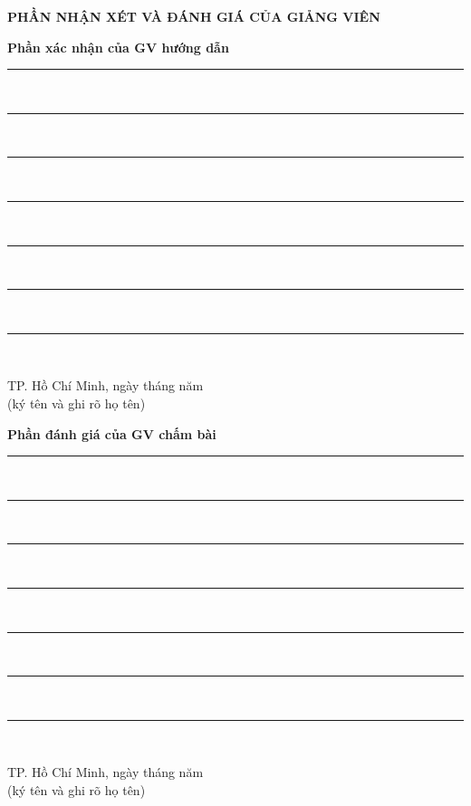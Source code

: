 \documentclass{report}
\newcommand\tab[1][1.25cm]{\hspace*{#1}}
\begin{document}
\begin{center}
	\fontsize{16}{20}\selectfont
	\textbf{PHẦN NHẬN XÉT VÀ ĐÁNH GIÁ CỦA GIẢNG VIÊN}\\
\end{center}
\fontsize{13}{14}\selectfont
\textbf{Phần xác nhận của GV hướng dẫn}\\
\rule{17cm}{1pt}\\
\rule{17cm}{1pt}\\
\rule{17cm}{1pt}\\
\rule{17cm}{1pt}\\
\rule{17cm}{1pt}\\
\rule{17cm}{1pt}\\
\rule{17cm}{1pt}\\
\begin{flushright}
	TP. Hồ Chí Minh, ngày \tab[1cm] tháng \tab[1cm] năm \tab[1cm]\tab \\
	(ký tên và ghi rõ họ tên)\tab[2cm] \\
	\vspace{2cm}
\end{flushright}
\fontsize{13}{14}\selectfont
\textbf{Phần đánh giá của GV chấm bài}\\
\rule{17cm}{1pt}\\
\rule{17cm}{1pt}\\
\rule{17cm}{1pt}\\
\rule{17cm}{1pt}\\
\rule{17cm}{1pt}\\
\rule{17cm}{1pt}\\
\rule{17cm}{1pt}\\
\begin{flushright}
	TP. Hồ Chí Minh, ngày \tab[1cm] tháng \tab[1cm] năm \tab[1cm]\tab \\
	(ký tên và ghi rõ họ tên)\tab[2cm] \\
	\vspace{1.5cm}
\end{flushright}
\pagebreak

\fontsize{13}{15}\selectfont

\pagebreak

\fontsize{13}{20}\selectfont
\tableofcontents
\pagebreak
\end{document}
